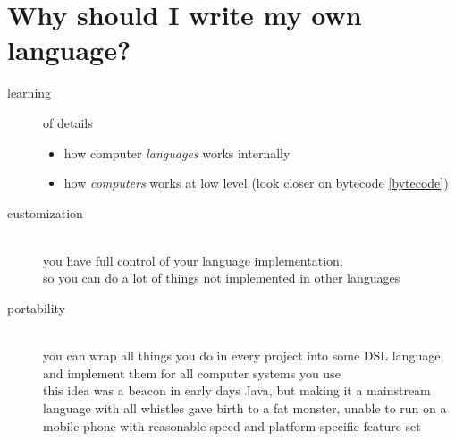 \section{Why should I write my own language?}\label{whylanguage}

\begin{description}
\item[learning] of details
\begin{itemize}
  \item 
how computer \emph{languages} works internally
\item
how \emph{computers} works at low level (look closer on bytecode \ref{bytecode}) 
\end{itemize} 
\item[customization]\ \\
you have full control of your language implementation,\\
so you can do a lot of things not implemented in other languages
\item[portability]\ \\
you can wrap all things you do in every project into some DSL language, and
implement them for all computer systems you use\\
this idea was a beacon in early days Java, but making it a mainstream language
with all whistles gave birth to a fat monster, unable to run on a mobile phone
with reasonable speed and platform-specific feature set
\end{description}
